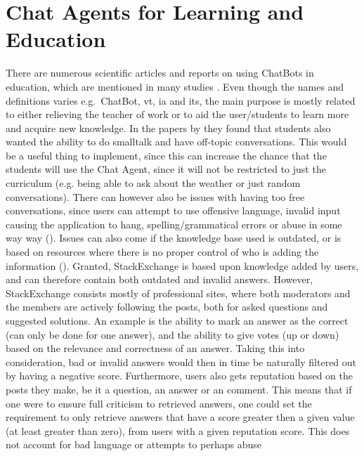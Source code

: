 \section{Chat Agents for Learning and Education}
\label{chapter3:learning_with_chatbots}
There are numerous scientific articles and reports on using ChatBots in education, which are mentioned in many studies 
 \cite{Crutzen2011,Kerly2008,Knill2004,Kowalski2013,Jia2009,Gulenko,Imran2014,Kerly2007,Reed2011,Rossi2011}. Even though the names and definitions varies e.g.~ChatBot, \gls{vt}, 
\gls{ia} and \gls{its}, the main purpose is mostly related to either relieving the teacher of work or to aid the user/students to learn more and acquire new knowledge. In the 
papers by \cite{Kerly2008,Knill2004,Kerly2007} they found that students also wanted the ability to do smalltalk and have off-topic conversations. This would be a useful thing to implement, 
since this can increase the chance that the students will use the Chat Agent, since it will not be restricted to just the curriculum (e.g. being able to ask about the weather 
or just random conversations). There can however also be issues with having too free conversations, since users can attempt to use offensive language, invalid input causing 
the application to hang, spelling/grammatical errors or abuse in some way way (\citet{Kerly2008}). Issues can also come if the knowledge base used is outdated, or is based on resources 
where there is no proper control of who is adding the information (\citet{Knill2004,Imran2014,Reed2011}).
\vspace{0.5em}\newline
Granted, StackExchange is based upon knowledge added by users, and can therefore contain both outdated and invalid answers. However, StackExchange consists mostly of professional 
sites, where both moderators and the members are actively following the posts, both for asked questions and suggested solutions. An example is the ability to mark an answer as 
the correct (can only be done for one answer), and the ability to give votes (up or down) based on the relevance and correctness of an answer. Taking this into consideration, 
bad or invalid answers would then in time be naturally filtered out by having a negative score. Furthermore, users also gets reputation based on the posts they make, be it a 
question, an answer or an comment. This means that if one were to ensure full criticism to retrieved answers, one could set the requirement to only retrieve answers that have 
a score greater then a given value (at least greater than zero), from users with a given reputation score. This does not account for bad language or attempts to perhaps abuse 
